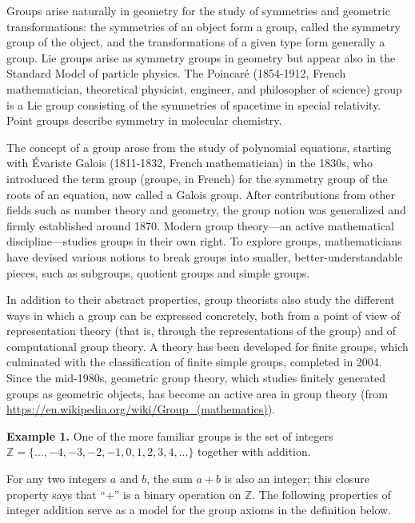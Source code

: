 \documentclass{article}
\begin{document}
\begin{tcolorbox}
  Groups arise naturally in geometry for the study of symmetries and geometric transformations: the symmetries of an object form a group, called the symmetry group of the object, and the transformations of a given type form generally a group. Lie groups arise as symmetry groups in geometry but appear also in the Standard Model of particle physics. The Poincaré (1854-1912, French mathematician, theoretical physicist, engineer, and philosopher of science) group is a Lie group consisting of the symmetries of spacetime in special relativity. Point groups describe symmetry in molecular chemistry.
  
  The concept of a group arose from the study of polynomial equations, starting with Évariste Galois (1811-1832, French mathematician) in the 1830s, who introduced the term group (groupe, in French) for the symmetry group of the roots of an equation, now called a Galois group. After contributions from other fields such as number theory and geometry, the group notion was generalized and firmly established around 1870. Modern group theory—an active mathematical discipline—studies groups in their own right. To explore groups, mathematicians have devised various notions to break groups into smaller, better-understandable pieces, such as subgroups, quotient groups and simple groups.
\end{tcolorbox}

\begin{tcolorbox}
  In addition to their abstract properties, group theorists also study the different ways in which a group can be expressed concretely, both from a point of view of representation theory (that is, through the representations of the group) and of computational group theory. A theory has been developed for finite groups, which culminated with the classification of finite simple groups, completed in 2004. Since the mid-1980s, geometric group theory, which studies finitely generated groups as geometric objects, has become an active area in group theory (from \url{https://en.wikipedia.org/wiki/Group_(mathematics)}).
\end{tcolorbox}

\textbf{Example 1.} One of the more familiar groups is the set of integers $\mathbb{Z} = \{. . . , -4, -3, -2, -1, 0, 1, 2, 3, 4, . . .\}$ together with addition.

For any two integers $a$ and $b$, the sum $a + b$ is also an integer; this closure property says that “+” is a binary operation on $\mathbb{Z}$. The following properties of integer addition serve as a model for the group axioms in the definition below.
\end{document}
